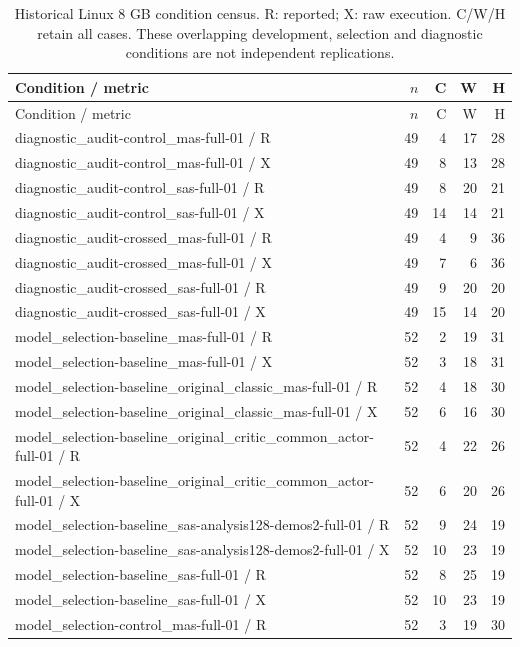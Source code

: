 {\small\setlength{\tabcolsep}{3pt}\begin{longtable}{p{}rrrr}
\caption{Historical Linux 8 GB condition census. R: reported; X: raw execution. C/W/H retain all cases. These overlapping development, selection and diagnostic conditions are not independent replications.}\\
Condition / metric & $n$ & C & W & H\\\hline\endfirsthead
Condition / metric & $n$ & C & W & H\\\hline\endhead
diagnostic\_audit-control\_mas-full-01 / R & 49 & 4 & 17 & 28 \\
diagnostic\_audit-control\_mas-full-01 / X & 49 & 8 & 13 & 28 \\
diagnostic\_audit-control\_sas-full-01 / R & 49 & 8 & 20 & 21 \\
diagnostic\_audit-control\_sas-full-01 / X & 49 & 14 & 14 & 21 \\
diagnostic\_audit-crossed\_mas-full-01 / R & 49 & 4 & 9 & 36 \\
diagnostic\_audit-crossed\_mas-full-01 / X & 49 & 7 & 6 & 36 \\
diagnostic\_audit-crossed\_sas-full-01 / R & 49 & 9 & 20 & 20 \\
diagnostic\_audit-crossed\_sas-full-01 / X & 49 & 15 & 14 & 20 \\
model\_selection-baseline\_mas-full-01 / R & 52 & 2 & 19 & 31 \\
model\_selection-baseline\_mas-full-01 / X & 52 & 3 & 18 & 31 \\
model\_selection-baseline\_original\_classic\_mas-full-01 / R & 52 & 4 & 18 & 30 \\
model\_selection-baseline\_original\_classic\_mas-full-01 / X & 52 & 6 & 16 & 30 \\
model\_selection-baseline\_original\_critic\_common\_actor-full-01 / R & 52 & 4 & 22 & 26 \\
model\_selection-baseline\_original\_critic\_common\_actor-full-01 / X & 52 & 6 & 20 & 26 \\
model\_selection-baseline\_sas-analysis128-demos2-full-01 / R & 52 & 9 & 24 & 19 \\
model\_selection-baseline\_sas-analysis128-demos2-full-01 / X & 52 & 10 & 23 & 19 \\
model\_selection-baseline\_sas-full-01 / R & 52 & 8 & 25 & 19 \\
model\_selection-baseline\_sas-full-01 / X & 52 & 10 & 23 & 19 \\
model\_selection-control\_mas-full-01 / R & 52 & 3 & 19 & 30 \\

\end{longtable}}
